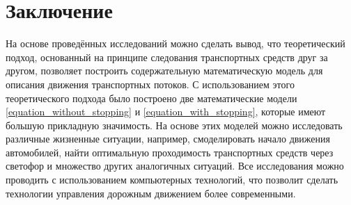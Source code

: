 \documentclass[12pt, a4paper]{extarticle}
\numberwithin{equation}{section}
\begin{document}
\section*{Заключение}
На основе проведённых исследований можно сделать вывод, что теоретический подход, основанный на принципе следования транспортных средств друг за другом, позволяет построить содержательную математическую модель для описания движения транспортных потоков. С использованием этого теоретического подхода было построено две математические модели  \eqref{equation_without_stopping} и \eqref{equation_with_stopping}, которые имеют большую прикладную значимость. На основе этих моделей можно исследовать различные жизненные ситуации, например, смоделировать начало движения автомобилей, найти оптимальную проходимость транспортных средств через светофор и множество других аналогичных ситуаций. Все исследования можно проводить с использованием компьютерных технологий, что позволит сделать технологии управления дорожным движением более современными.

\newpage
\end{document}

